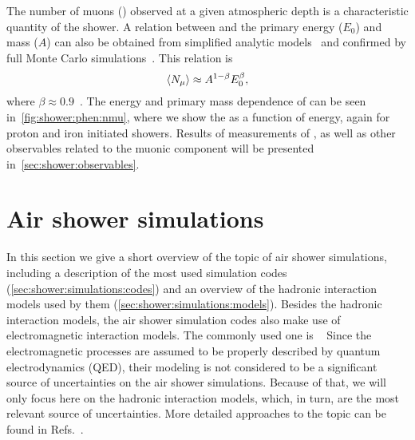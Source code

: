 
The number of muons (\nmu) observed
at a given atmospheric depth is a characteristic quantity of the shower.
A relation between \nmu and the primary energy ($E_0$) and mass ($A$)
can also be obtained from simplified analytic models~\cite{Matthews:2005sd}
and confirmed by full Monte Carlo simulations~\cite{AlvarezMuniz:2002ne}.
This relation is 
\begin{equation}
  \mbox{$\langle N_\mu\rangle$} \approx A^{1-\beta} E_0^\beta,
  \label{eq:shower:nmu}
\end{equation}
where $\beta\approx 0.9$~\cite{AlvarezMuniz:2002ne}.
The energy and primary mass dependence
of \nmumean can be seen in~\cref{fig:shower:phen:nmu},
where we show the \nmumean as a function of energy,
again for proton and iron initiated showers.
Results of measurements of \nmu, as well as other
observables related to the muonic component will be presented
in~\cref{sec:shower:observables}.


\section{Air shower simulations}
\label{sec:shower:simulations}

In this section we give a short overview of the topic of air shower simulations,
including a description of the most used simulation codes 
(\cref{sec:shower:simulations:codes}) and
an overview of the hadronic interaction models used by them (\cref{sec:shower:simulations:models}). 
Besides the hadronic interaction models, the air shower simulation codes also
make use of electromagnetic interaction models. The commonly used one is \EGS~\cite{Nelson:1985ec}
Since the electromagnetic processes are assumed to be
properly described by quantum electrodynamics (QED),
their modeling is not considered to be a significant
source of uncertainties on the air shower simulations.
Because of that, we will only focus here on the hadronic interaction models,
which, in turn, are the most relevant source of uncertainties.
More detailed approaches to the topic can be found
in Refs.~\cite{Knapp:2002vs,Engel:2011zzb,Allen:2013ofa}.



